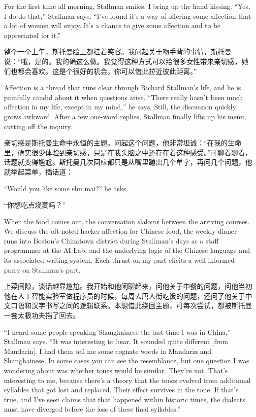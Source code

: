\ifdefined\eng
For the first time all morning, Stallman smiles. I bring up the hand kissing. ``Yes, I do do that,'' Stallman says. ``I've found it's a way of offering some affection that a lot of women will enjoy. It's a chance to give some affection and to be appreciated for it.''
\fi

\ifdefined\chs
整个一个上午，斯托曼脸上都挂着笑容。我问起关于吻手背的事情，斯托曼说：``哦，是的。我的确这么做。我觉得这种方式可以给很多女性带来亲切感，她们也都会喜欢。这是个很好的机会，你可以借此拉近彼此距离。''
\fi

\ifdefined\eng
Affection is a thread that runs clear through Richard Stallman's life, and he is painfully candid about it when questions arise. ``There really hasn't been much affection in my life, except in my mind,'' he says. Still, the discussion quickly grows awkward. After a few one-word replies, Stallman finally lifts up his menu, cutting off the inquiry.
\fi

\ifdefined\chs
亲切感是斯托曼生命中永恒的主题。问起这个问题，他非常坦诚：``在我的生命里，确实很少体验到亲切感，只是在我头脑之中还存在着这种感受。''可聊着聊着，话题就变得尴尬。斯托曼几次回应都只是从嘴里蹦出几个单字，再问几个问题，他就举起菜单，插话道：
\fi

\ifdefined\eng
``Would you like some shu mai?'' he asks.
\fi

\ifdefined\chs
``你想吃点烧麦吗？''
\fi

\ifdefined\eng
When the food comes out, the conversation slaloms between the arriving courses. We discuss the oft-noted hacker affection for Chinese food, the weekly dinner runs into Boston's Chinatown district during Stallman's days as a staff programmer at the AI Lab, and the underlying logic of the Chinese language and its associated writing system. Each thrust on my part elicits a well-informed parry on Stallman's part.
\fi

\ifdefined\chs
上菜间隙，谈话越显尴尬。我开始和他闲聊起来，问他关于中餐的问题，问他当初他在人工智能实验室做程序员的时候，每周去唐人街吃饭的问题，还问了他关于中文口语和汉字书写之间的逻辑联系。本想借此绕回主题，可每次尝试，都被斯托曼一套太极功夫挡了回去。
\fi

\ifdefined\eng
``I heard some people speaking Shanghainese the last time I was in China,'' Stallman says. ``It was interesting to hear. It sounded quite different [from Mandarin]. I had them tell me some cognate words in Mandarin and Shanghainese. In some cases you can see the resemblance, but one question I was wondering about was whether tones would be similar. They're not. That's interesting to me, because there's a theory that the tones evolved from additional syllables that got lost and replaced. Their effect survives in the tone. If that's true, and I've seen claims that that happened within historic times, the dialects must have diverged before the loss of these final syllables.''
\fi

